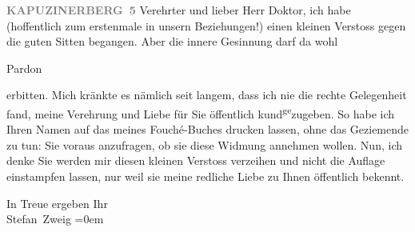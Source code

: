 \pstart
           \raggedleft{}\textcolor{gray}{\textbf{KAPUZINERBERG 5}}\pend
           \vspace{0.5em}
\pstart
           Verehrter und lieber Herr Doktor, ich habe (hoffentlich zum
               erstenmale in unsern Beziehungen!) einen kleinen Verstoss gegen die guten Sitten
               begangen. Aber die innere Gesinnung darf da wohl \begin{otherlanguage}{french}Pardon\end{otherlanguage} erbitten. Mich kränkte es
               nämlich seit langem, dass ich nie die rechte Gelegenheit fand, meine Verehrung und
               Liebe für Sie öffentlich kund\substVorne{}\textsuperscript{ge}\substDazwischen{}zu\substHinten{}geben. So habe ich Ihren Namen auf das \label{K_L03675-1v}\label{K_L03675-1} meines Fouché-Buches drucken {\pb}lassen,
               ohne das Geziemende zu tun: Sie voraus anzufragen, ob sie diese Widmung annehmen
               wollen. Nun, ich denke Sie werden mir diesen kleinen Verstoss verzeihen und nicht die
               Auflage einstampfen lassen, nur weil sie meine redliche Liebe zu Ihnen öffentlich
               bekennt.\pend
           
\pstart
           In Treue ergeben Ihr{\\[\baselineskip]}\spacefill\mbox{Stefan Zweig}\pend
           \leftskip=0em{}\endnumbering{}  \newcommand{\dateiname}{L03675}\newcommand{\titel}{Stefan Zweig an Arthur Schnitzler, 26. 7. 1929}\newcommand{\editorInnen}{Selma Jahnke und Martin Anton Müller}
